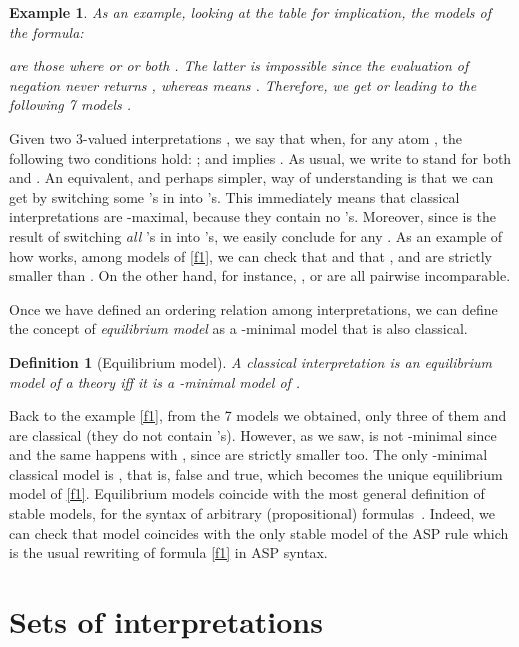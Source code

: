 \documentclass{tlp}
\def\qed{~\hfill}
\newtheorem{definition}{Definition}
\newtheorem{example}{Example}
\begin{document}
\begin{example}\label{ex:1}
As an example, looking at the table for implication, the models of the formula:

\noindent are those where  or  or both . The latter is impossible since the evaluation of negation never returns , whereas  means . Therefore, we get  or  leading to the following 7 models .  \qed
\end{example}

Given two 3-valued interpretations , we say that  when, for any atom , the following two conditions hold: ; and  implies . As usual, we write  to stand for both  and . An equivalent, and perhaps simpler, way of understanding  is that we can get  by switching some 's in  into 's. This immediately means that classical interpretations are -maximal, because they contain no 's. Moreover, since  is the result of switching \emph{all} 's in  into 's, we easily conclude  for any . As an example of how  works, among models of \eqref{f1}, we can check that  and that ,  and  are strictly smaller than . On the other hand, for instance, ,  or  are all pairwise incomparable.

Once we have defined an ordering relation among interpretations, we can define the concept of \emph{equilibrium model} as a -minimal model that is also classical.

\begin{definition}[Equilibrium model]
A classical interpretation  is an \emph{equilibrium model} of a theory  iff it is a -minimal model of .\qed
\end{definition}

Back to the example \eqref{f1}, from the 7 models we obtained, only three of them  and  are classical (they do not contain 's). However, as we saw,  is not -minimal since  and the same happens with , since  are strictly smaller too. The only -minimal classical model is , that is,  false and  true, which becomes the unique equilibrium model of \eqref{f1}. Equilibrium models coincide with the most general definition of stable models, for the syntax of arbitrary (propositional) formulas~\cite{Fer05}. Indeed, we can check that model  coincides with the only stable model of the ASP rule  which is the usual rewriting of formula \eqref{f1} in ASP syntax. 

\section{Sets of interpretations}\label{sec:sets}
\end{document}
